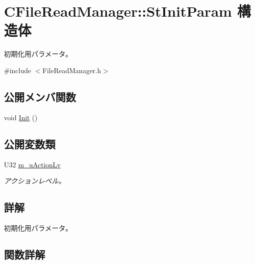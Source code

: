 \hypertarget{struct_c_file_read_manager_1_1_st_init_param}{}\section{C\+File\+Read\+Manager\+:\+:St\+Init\+Param 構造体}
\label{struct_c_file_read_manager_1_1_st_init_param}


初期化用パラメータ。  




{\ttfamily \#include $<$File\+Read\+Manager.\+h$>$}

\subsection*{公開メンバ関数}
\begin{DoxyCompactItemize}
\item 
void \hyperlink{struct_c_file_read_manager_1_1_st_init_param_aef86dec93b34dbd21432aa5f8f56714a}{Init} ()
\end{DoxyCompactItemize}
\subsection*{公開変数類}
\begin{DoxyCompactItemize}
\item 
U32 \hyperlink{struct_c_file_read_manager_1_1_st_init_param_af1cbc7ffa676618303cd8a340e5dabd9}{m\+\_\+u\+Action\+Lv}
\begin{DoxyCompactList}\small\item\em アクションレベル。 \end{DoxyCompactList}\end{DoxyCompactItemize}


\subsection{詳解}
初期化用パラメータ。 

\subsection{関数詳解}
\hypertarget{struct_c_file_read_manager_1_1_st_init_param_aef86dec93b34dbd21432aa5f8f56714a}{}
